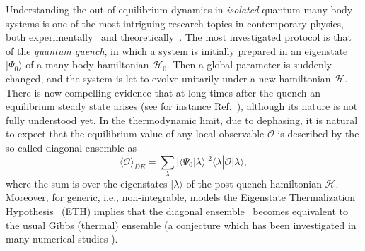 \documentclass[11pt]{iopart}
\begin{document}
Understanding the out-of-equilibrium dynamics in {\it isolated} quantum 
many-body systems is one of the most intriguing research topics in 
contemporary physics, both experimentally~\cite{bloch-2008,greiner-2002,
kinoshita-2006,hofferberth-2007,trotzky-2012,gring-2012,cheneau-2012,
schneider-2012,kunhert-2013,langen-2013,meinert-2013,fukuhara-2013,
ronzheimer-2013,braun-2014,langen-2015} and theoretically~\cite{polkovnikov-2011,efg-15}. 
The most investigated protocol is that of the {\it quantum quench}, in 
which a system is initially prepared in an eigenstate $|\Psi_0\rangle$ of 
a many-body hamiltonian ${\mathcal H}_0$. Then a global parameter is 
suddenly changed, and the system is let to evolve unitarily under a new 
hamiltonian ${\mathcal H}$. There is now compelling evidence that at long 
times after the quench an equilibrium steady state arises (see for instance 
Ref.~\cite{kinoshita-2006}), although its nature is not fully understood yet. 
In the thermodynamic limit, due to dephasing, it is natural to expect that 
the equilibrium value of any local observable ${\mathcal O}$ is described 
by the so-called diagonal ensemble as 
%
\begin{equation}
\label{d-ensemble}
\langle{\mathcal O}\rangle_{DE}=\sum\limits_{\lambda}|\langle\Psi_0|\lambda
\rangle|^2\langle\lambda|{\mathcal O}|\lambda\rangle,
\end{equation}
%
where the sum is over the eigenstates $|\lambda\rangle$ of the post-quench 
hamiltonian ${\mathcal H}$. Moreover, for generic, i.e., non-integrable, models 
the Eigenstate Thermalization Hypothesis~\cite{deutsch-1991,srednicki-1994} 
(ETH) implies that the diagonal ensemble~ becomes equivalent 
to the usual Gibbs (thermal) ensemble (a conjecture which has been investigated in many 
numerical studies \cite{tvar,alba-2015a}). 
\end{document}
